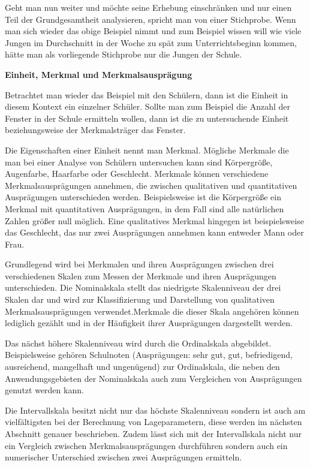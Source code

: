 Geht man nun weiter und möchte seine Erhebung einschränken und nur einen Teil der Grundgesamtheit analysieren, spricht man von einer Stichprobe. Wenn man sich wieder das obige Beispiel nimmt und zum Beispiel wissen will wie viele Jungen im Durchschnitt in der Woche zu spät zum Unterrichtsbeginn kommen, hätte man als vorliegende Stichprobe nur die Jungen der Schule.

\textbf{Einheit, Merkmal und Merkmalsausprägung}

Betrachtet man wieder das Beispiel mit den Schülern, dann ist die Einheit in diesem Kontext ein einzelner Schüler. Sollte man zum Beispiel die Anzahl der Fenster in der Schule ermitteln wollen, dann ist die zu untersuchende Einheit beziehungsweise der Merkmalsträger das Fenster.

Die Eigenschaften einer Einheit nennt man Merkmal. Mögliche Merkmale die man bei einer Analyse von Schülern untersuchen kann sind Körpergröße, Augenfarbe, Haarfarbe oder Geschlecht. Merkmale können verschiedene Merkmalsausprägungen annehmen, die zwischen qualitativen und quantitativen Ausprägungen unterschieden werden. Beispielsweise ist die Körpergröße ein Merkmal mit quantitativen Ausprägungen, in dem Fall sind alle natürlichen Zahlen größer null möglich. Eine qualitatives Merkmal hingegen ist beispielsweise das Geschlecht, das nur zwei Ausprägungen annehmen kann entweder Mann oder Frau.

Grundlegend wird bei Merkmalen und ihren Ausprägungen zwischen drei verschiedenen Skalen zum Messen der Merkmale und ihren Ausprägungen unterschieden. Die Nominalskala stellt das niedrigste Skalenniveau der drei Skalen dar und wird zur Klassifizierung und Darstellung von qualitativen Merkmalsausprägungen verwendet.Merkmale die dieser Skala angehören können lediglich gezählt und in der Häufigkeit ihrer Ausprägungen dargestellt werden.

Das nächst höhere Skalenniveau wird durch die Ordinalskala abgebildet. Beispielsweise gehören Schulnoten (Ausprägungen: sehr gut, gut, befriedigend, ausreichend, mangelhaft und ungenügend) zur Ordinalskala, die neben den Anwendungsgebieten der Nominalskala auch zum Vergleichen von Ausprägungen genutzt werden kann.

Die Intervallskala besitzt nicht nur das höchste Skalenniveau sondern ist auch am vielfältigsten bei der Berechnung von Lageparametern, diese werden im nächsten Abschnitt genauer beschrieben. Zudem lässt sich mit der Intervallskala nicht nur ein Vergleich zwischen Merkmalsausprägungen durchführen sondern auch ein numerischer Unterschied zwischen zwei Ausprägungen ermitteln.


